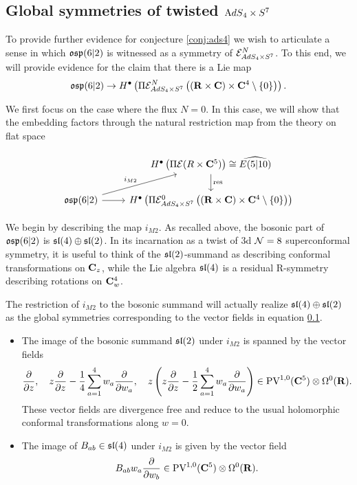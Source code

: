 \documentclass[../main.tex]{subfiles}
\begin{document}
\subsection{Global symmetries of twisted ${\mathrm{A}dS}_4 \times S^7$}

To provide further evidence for conjecture \ref{conj:ads4} we wish to articulate a sense in which $\mathfrak{osp}(6|2)$ is witnessed as a symmetry of $\mathcal{E}^N_{AdS_4\times S^7}$. To this end, we will provide evidence for the claim that there is a Lie map 
\[\mathfrak{osp}(6|2)\to H^\bullet \left ( \Pi \mathcal{E}^N_{AdS_4\times S^7} \left ( (\mathbf{R}\times \mathbf{C}) \times \mathbf{C}^4\setminus \{0\} \right ) \right ).\]

We first focus on the case where the flux $N=0$. In this case, we will show that the embedding factors through the natural restriction map from the theory on flat space

\[ 
\begin{tikzcd}
& H^\bullet \left ( \Pi \mc E (R\times \C^5)\right )\cong\widehat{E(5|10) }\ar[d, "\mr{res}"] \\
\mf{osp}(6|2)\ar[ur, "i_{M2}"]\ar[r] & H^\bullet \left ( \Pi \mc E^0_{AdS_4\times S^7} \left ( (\R\times \C) \times \C^4\setminus \{0\} \right ) \right )
\end{tikzcd}
\]
\parsec[] 

We begin by describing the map $i_{M2}$. As recalled above, the bosonic part of $\mathfrak{osp}(6|2)$ is $\mathfrak{sl}(4)\oplus \mathfrak{sl}(2)$. In its incarnation as a twist of 3d $\mathcal{N}=8$ superconformal symmetry, it is useful to think of the $\mathfrak{sl}(2)$-summand as describing conformal transformations on $\mathbf{C}_z$, while the Lie algebra $\mathfrak{sl}(4)$ is a residual R-symmetry describing rotations on $\mathbf{C}^4_w$.

The restriction of $i_{M2}$ to the bosonic summand will actually realize $\mathfrak{sl}(4)\oplus \mathfrak{sl}(2)$ as the global symmetries corresponding to the vector fields in equation \ref{}.
\begin{itemize}
\item The image of the bosonic summand $\mathfrak{sl}(2)$ under $i_{M2}$ is spanned by the vector fields
\[
\frac{\partial}{\partial z} ,\quad z \frac{\partial}{\partial z} - \frac14 \sum_{a=1}^4 w_a \frac{\partial}{\partial w_a} , \quad z \left(z \frac{\partial}{\partial z} - \frac12 \sum_{a=1}^4 w_a \frac{\partial}{\partial w_a} \right) \in \text{PV}^{1,0}(\mathbf{C}^5) \otimes \Omega^0(\mathbf{R}).
\]
These vector fields are divergence free and reduce to the usual holomorphic conformal transformations along $w=0$.
\item The image of $B_{ab}\in \mathfrak{sl}(4)$ under $i_{M2}$ is given by the vector field
\[
B_{ab} w_a \frac{\partial}{\partial w_b} \in \text{PV}^{1,0}(\mathbf{C}^5) \otimes \Omega^0(\mathbf{R}).
\]
\end{itemize}
\end{document}
